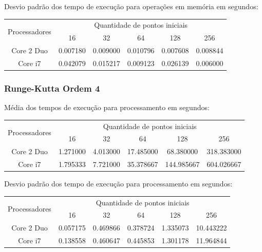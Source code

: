     \hspace{1mm}\newline
    
    \noindent Desvio padrão dos tempo de execução para operações em memória em segundos:\\
    \begin{tabular}{| c | c | c | c | c | c |}
      \hline
      \multirow{2}{*}{Processadores}& \multicolumn{5}{|c|}{Quantidade de pontos iniciais} \\ \cline{2-6}
      & 16 & 32 & 64 & 128 & 256 \\ \hline
      Core 2 Duo & 0.007180 & 0.009000 & 0.010796 & 0.007608 & 0.008844\\ \hline
      Core i7 & 0.042079 & 0.015217 & 0.009123 & 0.026139 & 0.006000 \\ \hline

      \hline
    \end{tabular}
    
    \subsubsection{Runge-Kutta Ordem 4} 
    Média dos tempos de execução para processamento em segundos:\\
    \begin{tabular}{| c | c | c | c | c | c |}
      \hline
      \multirow{2}{*}{Processadores}& \multicolumn{5}{|c|}{Quantidade de pontos iniciais} \\ \cline{2-6}
      & 16 & 32 & 64 & 128 & 256 \\ \hline
      Core 2 Duo & 1.271000 & 4.013000 & 17.485000 & 68.380000 & 318.383000 \\ \hline
      Core i7 & 1.795333 & 7.721000 & 35.378667 & 144.985667 & 604.026667\\ \hline

      \hline
    \end{tabular}
    
    \hspace{1mm}\newline
    
    \noindent Desvio padrão dos tempo de execução para processamento em segundos:\\
    \begin{tabular}{| c | c | c | c | c | c |}
      \hline
      \multirow{2}{*}{Processadores}& \multicolumn{5}{|c|}{Quantidade de pontos iniciais} \\ \cline{2-6}
      & 16 & 32 & 64 & 128 & 256 \\ \hline
      Core 2 Duo & 0.057175 & 0.469866 & 0.378724 & 1.335073 & 10.443222 \\ \hline
      Core i7 & 0.138558 & 0.460647 & 0.445853 & 1.301178 & 11.964844 \\ \hline

      \hline
    \end{tabular}
    
